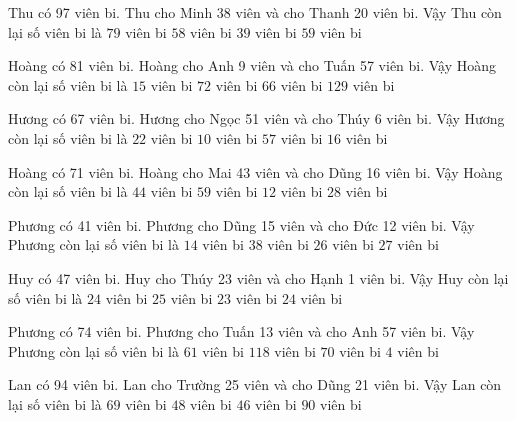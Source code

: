 \documentclass[12pt,a4paper]{article}
\begin{document}
\begin{ex}
Thu có 97 viên bi. Thu cho Minh 38 viên và cho Thanh 20 viên bi. Vậy Thu còn lại số viên bi là
 \choice 
{$79$ viên bi}
{$58$ viên bi}
{\True $39$ viên bi}
{$59$ viên bi}
\end{ex}
\begin{ex}
Hoàng có 81 viên bi. Hoàng cho Anh 9 viên và cho Tuấn 57 viên bi. Vậy Hoàng còn lại số viên bi là
 \choice 
{\True $15$ viên bi}
{$72$ viên bi}
{$66$ viên bi}
{$129$ viên bi}
\end{ex}
\begin{ex}
Hương có 67 viên bi. Hương cho Ngọc 51 viên và cho Thúy 6 viên bi. Vậy Hương còn lại số viên bi là
 \choice 
{$22$ viên bi}
{\True $10$ viên bi}
{$57$ viên bi}
{$16$ viên bi}
\end{ex}
\begin{ex}
Hoàng có 71 viên bi. Hoàng cho Mai 43 viên và cho Dũng 16 viên bi. Vậy Hoàng còn lại số viên bi là
 \choice 
{$44$ viên bi}
{$59$ viên bi}
{\True $12$ viên bi}
{$28$ viên bi}
\end{ex}
\begin{ex}
Phương có 41 viên bi. Phương cho Dũng 15 viên và cho Đức 12 viên bi. Vậy Phương còn lại số viên bi là
 \choice 
{\True $14$ viên bi}
{$38$ viên bi}
{$26$ viên bi}
{$27$ viên bi}
\end{ex}
\begin{ex}
Huy có 47 viên bi. Huy cho Thúy 23 viên và cho Hạnh 1 viên bi. Vậy Huy còn lại số viên bi là
 \choice 
{$24$ viên bi}
{$25$ viên bi}
{\True $23$ viên bi}
{$24$ viên bi}
\end{ex}
\begin{ex}
Phương có 74 viên bi. Phương cho Tuấn 13 viên và cho Anh 57 viên bi. Vậy Phương còn lại số viên bi là
 \choice 
{$61$ viên bi}
{$118$ viên bi}
{$70$ viên bi}
{\True $4$ viên bi}
\end{ex}
\begin{ex}
Lan có 94 viên bi. Lan cho Trường 25 viên và cho Dũng 21 viên bi. Vậy Lan còn lại số viên bi là
 \choice 
{$69$ viên bi}
{\True $48$ viên bi}
{$46$ viên bi}
{$90$ viên bi}
\end{ex}
\end{document}
